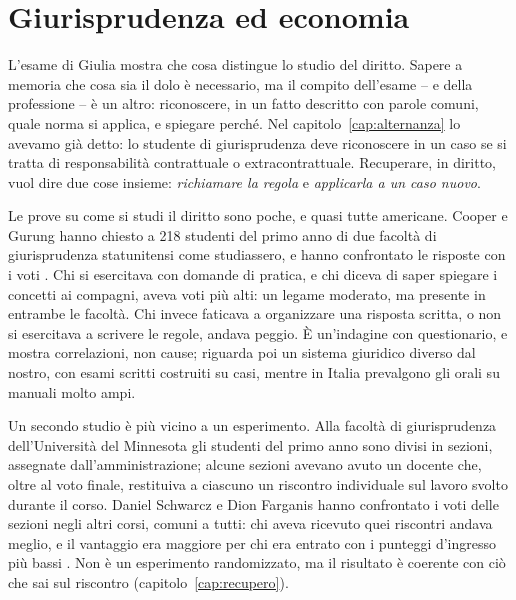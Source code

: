 \section{Giurisprudenza ed economia}

L'esame di Giulia mostra che cosa distingue lo studio del diritto.
Sapere a memoria che cosa sia il dolo è necessario, ma il compito
dell'esame -- e della professione -- è un altro: riconoscere, in un
fatto descritto con parole comuni, quale norma si applica, e
spiegare perché. Nel capitolo~\ref{cap:alternanza} lo avevamo già
detto: lo studente di giurisprudenza deve riconoscere in un caso se si
tratta di responsabilità contrattuale o extracontrattuale. Recuperare,
in diritto, vuol dire due cose insieme: \emph{richiamare la regola} e
\emph{applicarla a un caso nuovo}.

Le prove su come si studi il diritto sono poche, e quasi tutte
americane. Cooper e Gurung hanno chiesto a 218 studenti
del primo anno di due facoltà di giurisprudenza statunitensi come
studiassero, e hanno confrontato le risposte con i voti
\parencite{cooper2018}. Chi si esercitava con domande di pratica, e chi
diceva di saper spiegare i concetti ai compagni, aveva voti più alti:
un legame moderato, ma presente in entrambe le facoltà. Chi invece
faticava a organizzare una risposta scritta, o non si esercitava a
scrivere le regole, andava peggio. È un'indagine con questionario, e
mostra correlazioni, non cause; riguarda poi un sistema giuridico
diverso dal nostro, con esami scritti costruiti su casi, mentre in
Italia prevalgono gli orali su manuali molto ampi.

Un secondo studio è più vicino a un esperimento. Alla facoltà di
giurisprudenza dell'Università del Minnesota gli studenti del primo
anno sono divisi in sezioni, assegnate dall'amministrazione; alcune
sezioni avevano avuto un docente che, oltre al voto finale, restituiva
a ciascuno un riscontro individuale sul lavoro svolto durante il
corso. Daniel Schwarcz e Dion Farganis hanno confrontato i voti delle
sezioni negli altri corsi, comuni a tutti: chi aveva ricevuto quei
riscontri andava meglio, e il vantaggio era maggiore per chi era
entrato con i punteggi d'ingresso più bassi \parencite{schwarcz2017}.
Non è un esperimento randomizzato, ma il risultato è coerente con ciò
che sai sul riscontro (capitolo~\ref{cap:recupero}).

